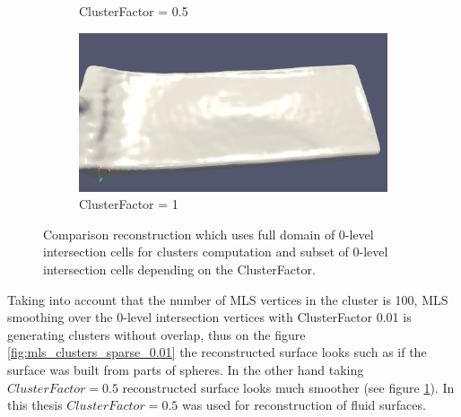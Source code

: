 \begin{figure}[h]
\begin{center}
\begin{subfigure}[b]{0.4\textwidth}
			\caption{ClusterFactor = 0.5} \label{fig:mls_clusters_sparse_0.5}
		\end{subfigure}
		\begin{subfigure}[b]{0.4\textwidth}
			\includegraphics[width=\textwidth]{figures/MlsSparseClusters1.png}
			\caption{ClusterFactor = 1} \label{fig:mls_clusters_sparse_1}
		\end{subfigure}

	\end{center}
	\caption{Comparison reconstruction which uses full domain of 0-level intersection cells for clusters computation and subset of 0-level intersection cells depending on the ClusterFactor.} \label{fig:mls_sparse_clusters_reconstruction}
\end{figure} 
Taking into account that the number of MLS vertices in the cluster is 100, MLS smoothing over the 0-level intersection vertices with ClusterFactor 0.01 is generating clusters without overlap, thus on the figure \ref{fig:mls_clusters_sparse_0.01} the reconstructed surface looks such as if the surface was built from parts of spheres. In the other hand taking $ClusterFactor = 0.5$ reconstructed surface looks much smoother (see figure \ref{fig:mls_clusters_sparse_0.5}). In this thesis $ClusterFactor = 0.5$ was used for reconstruction of fluid surfaces. 



